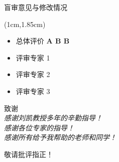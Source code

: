 \begin{frame}{盲审意见与修改情况}
\newBackground
\begin{center}
\begin{textblock*}{\textwidth}(1cm,1.85cm)
\begin{itemize}[itemsep=0.2\baselineskip] \englishfont
	\item[\ding{111}] \textcolor{cqublue}{总体评价 \textbf{A B B}}
	\item[\ding{111}] \textcolor{cqublue}{评审专家 1}
		\begin{itemize}[itemsep=0.2\baselineskip] 
		\end{itemize}
	\item[\ding{111}] \textcolor{cqublue}{评审专家 2}
		\begin{itemize}[itemsep=0.2\baselineskip] 
		\end{itemize}
		\item[\ding{111}] \textcolor{cqublue}{评审专家 3}
		\begin{itemize}[itemsep=0.2\baselineskip] 
		\end{itemize}
\end{itemize}
\end{textblock*}
\end{center}
\end{frame}

\begin{frame}
\newBackground
\Background
    \begin{center} \doublespacing
        {\Huge 致谢}\\
       	\textit{感谢刘凯教授多年的辛勤指导！}\\
       	\textit{感谢各位专家的指导！}\\
       	\textit{感谢所有给予我帮助的老师和同学！}
    \end{center}
\end{frame}

\begin{frame}
\newBackground
\Background
    \begin{center} \doublespacing
        {\Huge 敬请批评指正！}
    \end{center}
\end{frame}